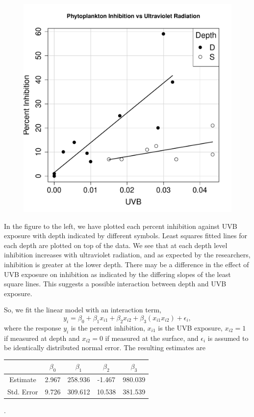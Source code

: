 \documentclass{homework}
\begin{document}
\begin{figure}
\includegraphics[width=.5\textwidth]{ozone_eda.pdf}
\end{figure}
In the figure to the left, we have plotted each percent inhibition against UVB
exposure with depth indicated by different symbols.  Least squares fitted lines
for each depth are plotted on top of the data.  We see that at each depth level
inhibition increases with ultraviolet radiation, and as expected by
the researchers, inhibition is greater at the lower depth.
There may be a difference in the effect of UVB exposure on inhibition as
indicated by the differing slopes of the least square lines.  This suggests a
possible interaction between depth and UVB exposure.

So, we fit the linear model with an interaction term,
$$
  y_i = \beta_0 + \beta_1x_{i1} + \beta_2x_{i2} + \beta_3 (x_{i1}x_{i2}) + \epsilon_i,
$$
where the response $y_i$ is the percent inhibition, $x_{i1}$ is the UVB exposure, $x_{i2}=1$ if measured at depth and $x_{i2}=0$ if measured at the surface, and $\epsilon_i$ is assumed to be identically distributed normal error. The resulting estimates are
\begin{center}
\begin{tabular}{c| c c c c}
&$\beta_0$ &$ \beta_1$ &$ \beta_2$ &$ \beta_3$\\
\hline
Estimate & 2.967 & 258.936 & -1.467 & 980.039 \\ 
Std. Error & 9.726 & 309.612 & 10.538 & 381.539  \\
\hline
\end{tabular}.
\end{center}
\end{document}
